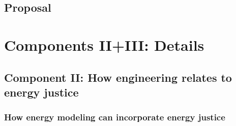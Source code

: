 

\subsection{Proposal}


\section{Components II+III: Details}
\subsection{Component II: How engineering relates to energy justice}
\begin{frame}
    \frametitle{How energy modeling can incorporate energy justice}
    
\end{frame}
